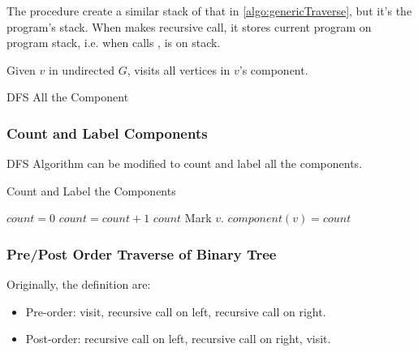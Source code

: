 \observation The procedure create a similar stack of that
in \cref{algo:genericTraverse}, but it's the program's stack.
When  makes recursive call, it stores
current program on program stack, i.e. when 
calls ,  is on stack.


Given $v$ in undirected $G$,  visits
all vertices in $v$'s component.

\begin{algorithm}[H]
    \caption{DFS All the Component}\label{algo:dfsall}
    \begin{algorithmic}[1]
                    \State{}
                \EndIf
            \EndFor
        \EndProcedure
    \end{algorithmic}
\end{algorithm}

\subsubsection{Count and Label Components}
DFS Algorithm can be modified to count and label all the components.
\begin{algorithm}[H]
\caption{Count and Label the Components}\label{algo:countlabel}
    \begin{algorithmic}[1]
            \State $count = 0$
                    \State $count = count + 1$
                    \State{}
                \EndIf
            \EndFor
            \Return $count$
        \EndProcedure
            \State Mark $v$.
            \State $component(v) = count$
                    \State{}
                \EndIf
            \EndFor
        \EndProcedure
    \end{algorithmic}
\end{algorithm}

\subsubsection{Pre/Post Order Traverse of Binary Tree}

Originally, the definition are:
\begin{itemize}
    \item Pre-order: visit, recursive call on left, recursive call on right.
    \item Post-order: recursive call on left, recursive call on right, visit.
\end{itemize}

